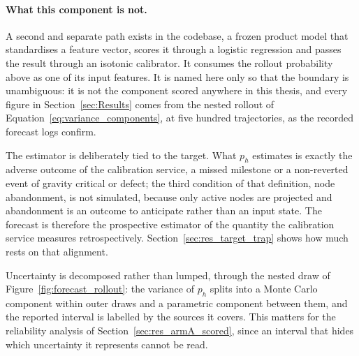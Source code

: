 \paragraph{What this component is not.}
A second and separate path exists in the codebase, a frozen product model that standardises a
feature vector, scores it through a logistic regression and passes the result through an
isotonic calibrator. It consumes the rollout probability above as one of its input features.
It is named here only so that the boundary is unambiguous: it is not the component scored
anywhere in this thesis, and every figure in Section~\ref{sec:Results} comes from the nested
rollout of Equation~\ref{eq:variance_components}, at five hundred trajectories, as the
recorded forecast logs confirm.


The estimator is deliberately tied to the target. What $p_h$ estimates is exactly the adverse
outcome of the calibration service, a missed milestone or a non-reverted event of gravity
critical or defect; the third condition of that definition, node abandonment, is not
simulated, because only active nodes are projected and abandonment is an outcome to
anticipate rather than an input state. The forecast is therefore the prospective estimator of
the quantity the calibration service measures retrospectively. Section~\ref{sec:res_target_trap}
shows how much rests on that alignment.

Uncertainty is decomposed rather than lumped, through the nested draw of
Figure~\ref{fig:forecast_rollout}: the variance of $p_h$ splits into a Monte Carlo component
within outer draws and a parametric component between them, and the reported interval is
labelled by the sources it covers. This matters for the reliability analysis of
Section~\ref{sec:res_armA_scored}, since an interval that hides which uncertainty it
represents cannot be read.

